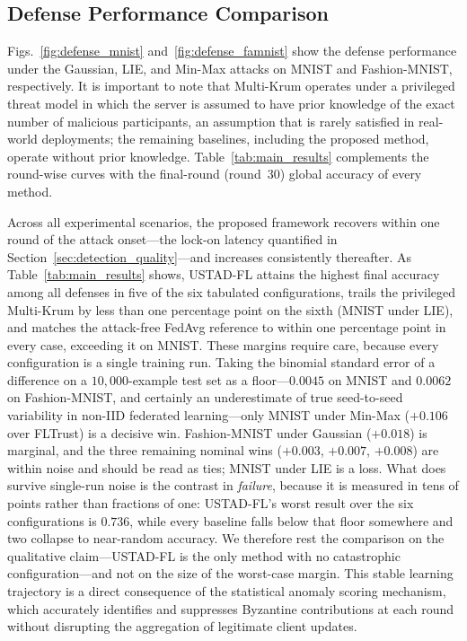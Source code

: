 \documentclass[journal]{IEEEtran}
\begin{document}
\subsection{Defense Performance Comparison}
\label{sec:defense_comparison}

Figs.~\ref{fig:defense_mnist} and~\ref{fig:defense_famnist} show the defense performance under the Gaussian, LIE, and Min-Max attacks on MNIST and Fashion-MNIST, respectively. It is important to note that Multi-Krum operates under a privileged threat model in which the server is assumed to have prior knowledge of the exact number of malicious participants, an assumption that is rarely satisfied in real-world deployments; the remaining baselines, including the proposed method, operate without prior knowledge. Table~\ref{tab:main_results} complements the round-wise curves with the final-round (round~$30$) global accuracy of every method.

Across all experimental scenarios, the proposed framework recovers within one round of the attack onset---the lock-on latency quantified in Section~\ref{sec:detection_quality}---and increases consistently thereafter. As Table~\ref{tab:main_results} shows, USTAD-FL attains the highest final accuracy among all defenses in five of the six tabulated configurations, trails the privileged Multi-Krum by less than one percentage point on the sixth (MNIST under LIE), and matches the attack-free FedAvg reference to within one percentage point in every case, exceeding it on MNIST. These margins require care, because every configuration is a single training run. Taking the binomial standard error of a difference on a $10{,}000$-example test set as a floor---$0.0045$ on MNIST and $0.0062$ on Fashion-MNIST, and certainly an underestimate of true seed-to-seed variability in non-IID federated learning---only MNIST under Min-Max ($+0.106$ over FLTrust) is a decisive win. Fashion-MNIST under Gaussian ($+0.018$) is marginal, and the three remaining nominal wins ($+0.003$, $+0.007$, $+0.008$) are within noise and should be read as ties; MNIST under LIE is a loss. What does survive single-run noise is the contrast in \emph{failure}, because it is measured in tens of points rather than fractions of one: USTAD-FL's worst result over the six configurations is $0.736$, while every baseline falls below that floor somewhere and two collapse to near-random accuracy. We therefore rest the comparison on the qualitative claim---USTAD-FL is the only method with no catastrophic configuration---and not on the size of the worst-case margin. This stable learning trajectory is a direct consequence of the statistical anomaly scoring mechanism, which accurately identifies and suppresses Byzantine contributions at each round without disrupting the aggregation of legitimate client updates.
\end{document}
